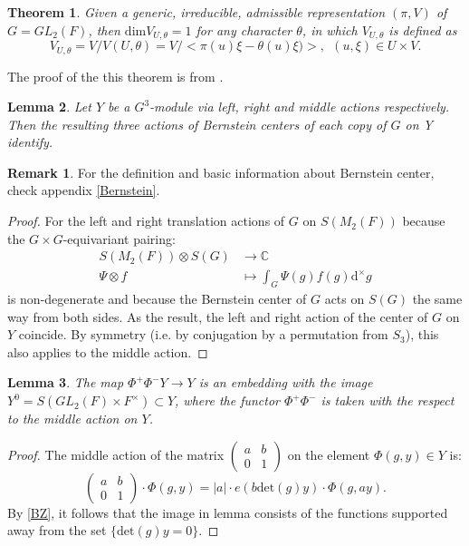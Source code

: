 \documentclass[12pt,a4paper,english]{article}
\theoremstyle{plain}
\newtheorem{thm}{Theorem}[section]
\newtheorem{lem}[thm]{Lemma}
\theoremstyle{definition}
\newtheorem*{rem}{Remark}
\begin{document}
\begin{thm}\label{1dim}
Given a generic, irreducible, admissible representation $(\pi, V)$ of $G=GL_{2}(F)$, then $\text{dim} V_{U,\theta}=1$ for any  character $\theta$, in which $V_{U, \theta}$ is defined as 
\begin{equation*}
    V_{U,\theta}=V/V(U,\theta)=V/<\pi(u)\xi-\theta(u)\xi)>,\ \ (u,\xi)\in U\times V.
\end{equation*}
\end{thm}
The proof of the this theorem is from \cite{bernstein1976representations}.



\begin{lem}
Let $Y$ be a $G^{3}$-module via left, right and middle actions respectively. Then the resulting three actions of Bernstein centers of each copy of $G$ on Y identify.
\end{lem}
\begin{rem}
For the definition and basic information about Bernstein center, check appendix \ref{Bernstein}.
\end{rem}
\begin{proof}
For the left and right translation actions of $G$ on $S(M_{2}(F))$ because the $G\times G$-equivariant pairing:
\begin{align*}
    S(M_{2}(F))\otimes S(G)&\rightarrow  \mathbb{C}\\
    \Psi \otimes f &\mapsto \int_{G} \Psi(g)f(g)\text{d}^{\times}g
\end{align*}
is non-degenerate and because the Bernstein center of $G$ acts on $S(G)$ the same way from both sides. As the result, the left and right action of the center of $G$ on $Y$ coincide. By symmetry (i.e. by conjugation by a permutation from $S_{3}$), this also applies to the middle action.
\end{proof}
\begin{lem}
The map $\Phi^{+}\Phi^{-}Y\rightarrow Y$ is an embedding with the image $Y^{0}=S(GL_{2}(F)\times F^{\times})\subset Y$, where the functor $\Phi^{+}\Phi^{-}$ is taken with the respect to the middle action on $Y$.
\end{lem}
\begin{proof}
The middle action of the matrix $\begin{pmatrix}
a &b\\
0&1
\end{pmatrix}$ on the element $\Phi(g, y)\in Y$ is:
\begin{equation*}
\begin{pmatrix}
a &b\\
0&1
\end{pmatrix}\cdot \Phi(g, y)=|a|\cdot e(b\text{det}(g)y)\cdot \Phi(g, ay).
\end{equation*}
By \ref{BZ}, it follows that the image in lemma consists of the functions supported away from the set $\{\text{det}(g)y=0\}$.
\end{proof} 
\end{document}
